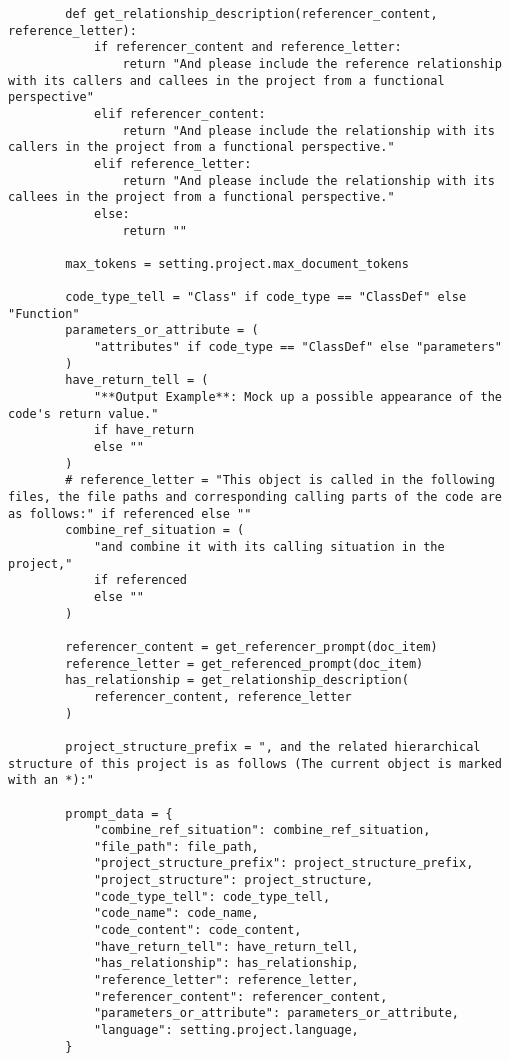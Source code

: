 \begin{verbatim}
        def get_relationship_description(referencer_content, reference_letter):
            if referencer_content and reference_letter:
                return "And please include the reference relationship with its callers and callees in the project from a functional perspective"
            elif referencer_content:
                return "And please include the relationship with its callers in the project from a functional perspective."
            elif reference_letter:
                return "And please include the relationship with its callees in the project from a functional perspective."
            else:
                return ""

        max_tokens = setting.project.max_document_tokens

        code_type_tell = "Class" if code_type == "ClassDef" else "Function"
        parameters_or_attribute = (
            "attributes" if code_type == "ClassDef" else "parameters"
        )
        have_return_tell = (
            "**Output Example**: Mock up a possible appearance of the code's return value."
            if have_return
            else ""
        )
        # reference_letter = "This object is called in the following files, the file paths and corresponding calling parts of the code are as follows:" if referenced else ""
        combine_ref_situation = (
            "and combine it with its calling situation in the project,"
            if referenced
            else ""
        )

        referencer_content = get_referencer_prompt(doc_item)
        reference_letter = get_referenced_prompt(doc_item)
        has_relationship = get_relationship_description(
            referencer_content, reference_letter
        )

        project_structure_prefix = ", and the related hierarchical structure of this project is as follows (The current object is marked with an *):"

        prompt_data = {
            "combine_ref_situation": combine_ref_situation,
            "file_path": file_path,
            "project_structure_prefix": project_structure_prefix,
            "project_structure": project_structure,
            "code_type_tell": code_type_tell,
            "code_name": code_name,
            "code_content": code_content,
            "have_return_tell": have_return_tell,
            "has_relationship": has_relationship,
            "reference_letter": reference_letter,
            "referencer_content": referencer_content,
            "parameters_or_attribute": parameters_or_attribute,
            "language": setting.project.language,
        }


\end{verbatim}
